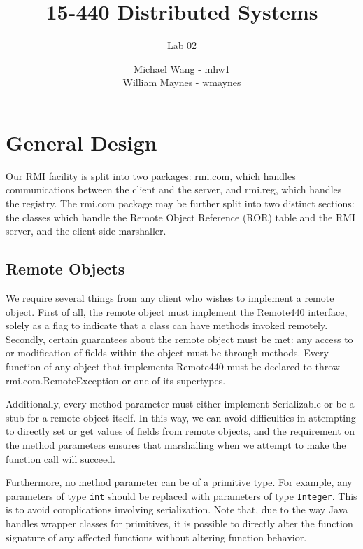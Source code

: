 \documentclass{scrartcl}
\title{15-440 Distributed Systems}
\subtitle{Lab 02}
\author{Michael Wang - mhw1\\William Maynes - wmaynes}
\begin{document}
\begin{center}

\maketitle

\end{center}

\section{General Design}

Our RMI facility is split into two packages: rmi.com, which handles communications between the client and the server, and rmi.reg, which handles the registry.  The rmi.com package may be further split into two distinct sections: the classes which 
handle the Remote Object Reference (ROR) table and the RMI server, and the client-side marshaller.

\subsection{Remote Objects}

We require several things from any client who wishes to implement a remote object.  First of all, the remote object must implement the Remote440 interface, solely as a flag to indicate that a class can have methods invoked remotely.  Secondly, certain guarantees about the remote object must be met: any access to or modification of fields within the object must be through methods.  Every function of any object that implements Remote440 must be declared to throw rmi.com.RemoteException or one of its supertypes.

Additionally, every method parameter must either implement Serializable or be a stub for a remote object itself.  In this way, we can avoid difficulties in attempting to directly set or get values of fields from remote objects, and the requirement on the method parameters ensures that marshalling when we attempt to make the function call will succeed.

Furthermore, no method parameter can be of a primitive type.  For example, any parameters of type \verb$int$ should be replaced with parameters of type \verb$Integer$.  This is to avoid complications involving serialization.  Note that, due to the way Java handles wrapper classes for primitives, it is possible to directly alter the function signature of any affected functions without altering function behavior.
\end{document}
